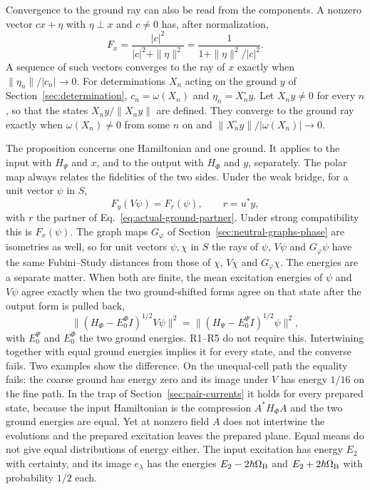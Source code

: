 Convergence to the ground ray can also be read from the components. A nonzero vector $cx+\eta$ with $\eta\perp x$ and $c\ne0$ has, after normalization,
\begin{equation}
 F_x=\frac{|c|^2}{|c|^2+\|\eta\|^2}=\frac1{1+\|\eta\|^2/|c|^2}.
 \label{eq:fidelity-energy-ratio}
\end{equation}
A sequence of such vectors converges to the ray of $x$ exactly when $\|\eta_n\|/|c_n|\to0$. For determinations $X_n$ acting on the ground $y$ of Section~\ref{sec:determination}, $c_n=\omega(X_n)$ and $\eta_n=X_n^\circ y$. Let $X_ny\ne0$ for every $n$, so that the states $X_ny/\|X_ny\|$ are defined. They converge to the ground ray exactly when $\omega(X_n)\ne0$ from some $n$ on and $\|X_n^\circ y\|/|\omega(X_n)|\to0$.

The proposition concerns one Hamiltonian and one ground. It applies to the input with $H_\Psi$ and $x$, and to the output with $H_\Phi$ and $y$, separately. The polar map always relates the fidelities of the two sides. Under the weak bridge, for a unit vector $\psi$ in $S$,
\begin{equation}
 F_y(V\psi)=F_r(\psi),\qquad r=u^*y,
 \label{eq:fidelity-energy-transport}
\end{equation}
with $r$ the partner of Eq.~\eqref{eq:actual-ground-partner}. Under strong compatibility this is $F_x(\psi)$. The graph maps $G_\varphi$ of Section~\ref{sec:neutral-graphs-phase} are isometries as well, so for unit vectors $\psi,\chi$ in $S$ the rays of $\psi$, $V\psi$ and $G_\varphi\psi$ have the same Fubini--Study distances from those of $\chi$, $V\chi$ and $G_\varphi\chi$. The energies are a separate matter. When both are finite, the mean excitation energies of $\psi$ and $V\psi$ agree exactly when the two ground-shifted forms agree on that state after the output form is pulled back,
\begin{equation}
 \bigl\|(H_\Phi-E_0^\Phi I)^{1/2}V\psi\bigr\|^2=\bigl\|(H_\Psi-E_0^\Psi I)^{1/2}\psi\bigr\|^2 ,
 \label{eq:fidelity-energy-forms}
\end{equation}
with $E_0^\Psi$ and $E_0^\Phi$ the two ground energies. R1--R5 do not require this. Intertwining together with equal ground energies implies it for every state, and the converse fails. Two examples show the difference. On the unequal-cell path the equality fails: the coarse ground has energy zero and its image under $V$ has energy $1/16$ on the fine path. In the trap of Section~\ref{sec:pair-currents} it holds for every prepared state, because the input Hamiltonian is the compression $A^*H_\Phi A$ and the two ground energies are equal. Yet at nonzero field $A$ does not intertwine the evolutions and the prepared excitation leaves the prepared plane. Equal means do not give equal distributions of energy either. The input excitation has energy $E_2$ with certainty, and its image $e_\lambda$ has the energies $E_2-2\hbar\Omega_{\rm B}$ and $E_2+2\hbar\Omega_{\rm B}$ with probability $1/2$ each.

